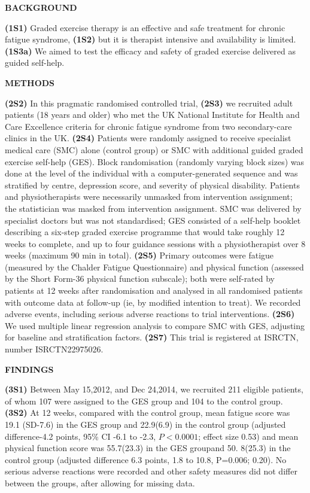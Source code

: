 \documentclass{ctexbook}
\begin{document}
\begin{sample}[label={myautocounter}]{\heiti}
  \textbf{BACKGROUND}

  \textbf{(1S1)} Graded exercise therapy is an effective and safe treatment for chronic fatigue syndrome, \textbf{(1S2)} but it is therapist intensive and availability is limited. \textbf{(1S3a)} We aimed to test the efficacy and safety of graded exercise delivered as guided self-help.
  
  \textbf{METHODS}

  \textbf{(2S2)} In this pragmatic randomised controlled trial, \textbf{(2S3)} we recruited adult patients (18 years and older) who met the UK National Institute for Health and Care Excellence criteria for chronic fatigue syndrome from two secondary-care clinics in the UK. \textbf{(2S4)} Patients were randomly assigned to receive specialist medical care (SMC) alone (control group) or SMC with additional guided graded exercise self-help (GES). Block randomisation (randomly varying block sizes) was done at the level of the individual with a computer-generated sequence and was stratified by centre, depression score, and severity of physical disability. Patients and physiotherapists were necessarily unmasked from intervention assignment; the statistician was masked from intervention assignment. SMC was delivered by specialist doctors but was not standardised; GES consisted of a self-help booklet describing a six-step graded exercise programme that would take roughly 12 weeks to complete, and up to four guidance sessions with a physiotherapist over 8 weeks (maximum 90 min in total). \textbf{(2S5)} Primary outcomes were fatigue (measured by the Chalder Fatigue Questionnaire) and physical function (assessed by the Short Form-36 physical function subscale); both were self-rated by patients at 12 weeks after randomisation and analysed in all randomised patients with outcome data at follow-up (ie, by modified intention to treat). We recorded adverse events, including serious adverse reactions to trial interventions.\textbf{ (2S6) }We used multiple linear regression analysis to compare SMC with GES, adjusting for baseline and stratification factors.\textbf{ (2S7) }This trial is registered at ISRCTN, number ISRCTN22975026.
  
  \textbf{FINDINGS}

  \textbf{(3S1)} Between May 15,2012, and Dec 24,2014, we recruited 211 eligible patients, of whom 107 were assigned to the GES group and 104 to the control group. \textbf{(3S2) }At 12 weeks, compared with the control group, mean fatigue score was 19.1 (SD-7.6) in the GES group and
  22.9(6.9) in the control group (adjusted difference-4.2 points, 95\% CI -6.1 to -2.3, $P<0.0 001$; effect size 0.53) and mean physical function score was 55.7(23.3) in the GES groupand 50. 8(25.3) in the control group (adjusted difference 6.3 points, 1.8 to 10.8, P=0.006;
  0.20). No serious adverse reactions were recorded and other safety measures did not differ between the groups, after allowing for missing data.


\end{sample}
\end{document}

